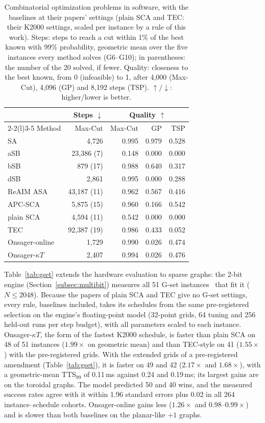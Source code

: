 \begin{table}[t]
\centering
\caption{Combinatorial optimization problems in software, with the baselines at their papers' settings (plain SCA and TEC: their K2000 settings, scaled per instance by a rule of this work). Steps: steps to reach a cut within 1\% of the best known with 99\% probability, geometric mean over the five instances every method solves (G6--G10); in parentheses: the number of the 20 solved, if fewer. Quality: closeness to the best known, from 0 (infeasible) to 1, after 4{,}000 (Max-Cut), 4{,}096 (GP) and 8{,}192 steps (TSP). $\uparrow$/$\downarrow$: higher/lower is better.}
\label{tab:cop}
\setlength{\tabcolsep}{2.5pt}
\begin{tabular}{@{}lrrrr@{}}
\toprule
& Steps $\downarrow$ & \multicolumn{3}{c}{Quality $\uparrow$} \\
\cmidrule(lr){2-2}\cmidrule(l){3-5}
Method & Max-Cut & Max-Cut & GP & TSP \\
\midrule
SA & 4{,}726 & 0.995 & 0.979 & 0.528 \\
aSB & 23{,}386 (7) & 0.148 & 0.000 & 0.000 \\
bSB & 879 (17) & 0.988 & 0.640 & 0.317 \\
dSB & 2{,}861 & 0.995 & 0.000 & 0.288 \\
ReAIM ASA & 43{,}187 (11) & 0.962 & 0.567 & 0.416 \\
APC-SCA & 5{,}875 (15) & 0.960 & 0.166 & 0.542 \\
plain SCA & 4{,}594 (11) & 0.542 & 0.000 & 0.000 \\
TEC & 92{,}387 (19) & 0.986 & 0.433 & 0.052 \\
Onsager-online & 1{,}729 & 0.990 & 0.026 & 0.474 \\
Onsager-$\kappa T$ & 2{,}407 & 0.994 & 0.026 & 0.476 \\
\bottomrule
\end{tabular}
\vspace{-0.6em}%
\end{table}
Table~\ref{tab:gset} extends the hardware evaluation to sparse graphs: the 2-bit engine (Section~\ref{subsec:multibit}) measures all 51 G-set instances~\cite{helmberg2000spectral,ye_gset} that fit it ($N\leq2048$). Because the papers of plain SCA and TEC give no G-set settings, every rule, baselines included, takes its schedules from the same pre-registered selection on the engine's floating-point model (32-point grids, 64 tuning and 256 held-out runs per step budget), with all parameters scaled to each instance. Onsager-$\kappa T$, the form of the fastest K2000 schedule, is faster than plain SCA on 48 of 51 instances ($1.99\times$ on geometric mean) and than TEC-style on 41 ($1.55\times$) with the pre-registered grids. With the extended grids of a pre-registered amendment (Table~\ref{tab:gset}), it is faster on 49 and 42 ($2.17\times$ and $1.68\times$), with a geometric-mean TTS$_{99}$ of 0.11\,ms against 0.24 and 0.19\,ms; its largest gains are on the toroidal graphs. The model predicted 50 and 40 wins, and the measured success rates agree with it within 1.96 standard errors plus 0.02 in all 264 instance--schedule cohorts. Onsager-online gains less ($1.26\times$ and 0.98--$0.99\times$) and is slower than both baselines on the planar-like $+1$ graphs.

